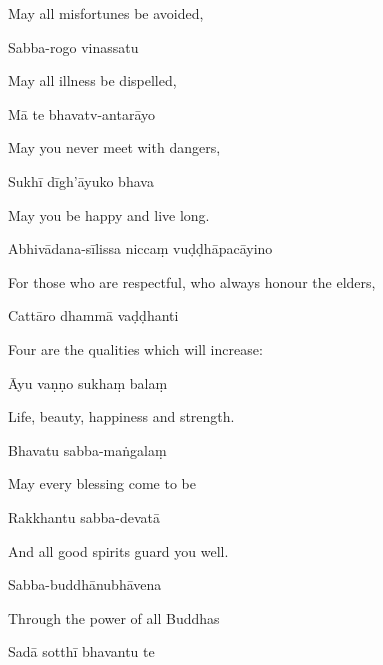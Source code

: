 \begin{english}
  May all misfortunes be avoided,
\end{english}

Sabba-rogo vinassatu

\begin{english}
  May all illness be dispelled,
\end{english}

Mā te bhavatv-antarāyo

\begin{english}
  May you never meet with dangers,
\end{english}

Sukhī dīgh'āyuko bhava

\begin{english}
  May you be happy and live long.
\end{english}

Abhivādana-sīlissa niccaṃ vuḍḍhāpacāyino

\begin{english}
  For those who are respectful, who always honour the elders,
\end{english}

Cattāro dhammā vaḍḍhanti

\begin{english}
  Four are the qualities which will increase:
\end{english}

Āyu vaṇṇo sukhaṃ balaṃ

\begin{english}
  Life, beauty, happiness and strength. 
\end{english}


Bhavatu sabba-maṅgalaṃ

\begin{english}
  May every blessing come to be
\end{english}

Rakkhantu sabba-devatā

\begin{english}
  And all good spirits guard you well.
\end{english}

Sabba-buddhānubhāvena

\begin{english}
  Through the power of all Buddhas
\end{english}

Sadā sotthī bhavantu te

